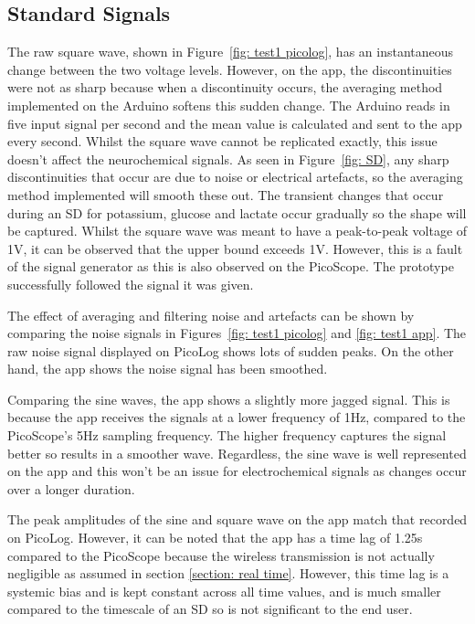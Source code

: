 \subsection{Standard Signals}

The raw square wave, shown in Figure~\ref{fig: test1 picolog}, has an instantaneous change between the two voltage levels. However, on the app, the discontinuities were not as sharp because when a discontinuity occurs, the averaging method implemented on the Arduino softens this sudden change. The Arduino reads in five input signal per second and the mean value is calculated and sent to the app every second. Whilst the square wave cannot be replicated exactly, this issue doesn't affect the neurochemical signals. As seen in Figure~\ref{fig: SD}, any sharp discontinuities that occur are due to noise or electrical artefacts, so the averaging method implemented will smooth these out. The transient changes that occur during an SD for potassium, glucose and lactate occur gradually so the shape will be captured. Whilst the square wave was meant to have a peak-to-peak voltage of 1V, it can be observed that the upper bound exceeds 1V. However, this is a fault of the signal generator as this is also observed on the PicoScope. The prototype successfully followed the signal it was given.

The effect of averaging and filtering noise and artefacts can be shown by comparing the noise signals in Figures~\ref{fig: test1 picolog} and \ref{fig: test1 app}. The raw noise signal displayed on PicoLog shows lots of sudden peaks. On the other hand, the app shows the noise signal has been smoothed. 

Comparing the sine waves, the app shows a slightly more jagged signal. This is because the app receives the signals at a lower frequency of 1Hz, compared to the PicoScope's 5Hz sampling frequency. The higher frequency captures the signal better so results in a smoother wave. Regardless, the sine wave is well represented on the app and this won't be an issue for electrochemical signals as changes occur over a longer duration. 

The peak amplitudes of the sine and square wave on the app match that recorded on PicoLog. However, it can be noted that the app has a time lag of 1.25s compared to the PicoScope because the wireless transmission is not actually negligible as assumed in section \ref{section: real time}. However, this time lag is a systemic bias and is kept constant across all time values, and is much smaller compared to the timescale of an SD so is not significant to the end user.



